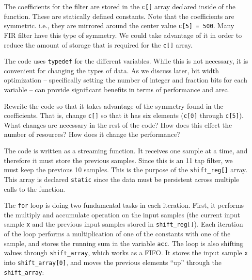The coefficients for the filter are stored in the \lstinline{c[]} array declared inside of the function. These are statically defined constants. Note that the coefficients are symmetric. i.e., they are mirrored around the center value \lstinline{c[5] = 500}. Many FIR filter have this type of symmetry. We could take advantage of it in order to reduce the amount of storage that is required for the \lstinline{c[]} array.

The code uses \lstinline{typedef} for the different variables. While this is not necessary, it is convenient for changing the types of data. As we discuss later, bit width optimization -- specifically setting the number of integer and fraction bits for each variable -- can provide significant benefits in terms of performance and area.  

\begin{exercise}
Rewrite the code so that it takes advantage of the symmetry found in the coefficients. That is, change \lstinline{c[]} so that it has six elements (\lstinline{c[0]} through \lstinline{c[5]}). What changes are necessary in the rest of the code? How does this effect the number of resources? How does it change the performance?
\end{exercise}

The code is written as a streaming function. It receives one sample at a time, and therefore it must store the previous samples. Since this is an 11 tap filter, we must keep the previous 10 samples. This is the purpose of the \lstinline{shift_reg[]} array. This array is declared \lstinline{static} since the data must be persistent across multiple calls to the function. 

The \lstinline{for} loop is doing two fundamental tasks in each iteration. First, it performs the multiply and accumulate operation on the input samples (the current input sample \lstinline{x} and the previous input samples stored in \lstinline{shift_reg[]}). Each iteration of the loop performs a multiplication of one of the constants with one of the sample, and stores the running sum in the variable \lstinline{acc}. The loop is also shifting values through \lstinline{shift_array}, which works as a FIFO. It stores the input sample \lstinline{x} into  \lstinline{shift_array[0]}, and moves the previous elements ``up'' through the \lstinline{shift_array}:

